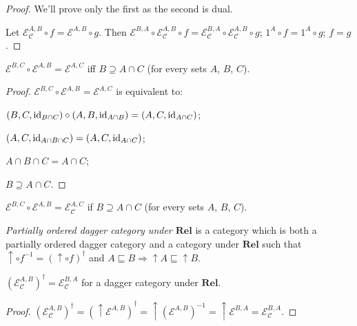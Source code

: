 \begin{proof}
  We'll prove only the first as the second is dual.
  
  Let $\mathcal{E}_{\mathcal{C}}^{A,B} \circ f = \mathcal{E}^{A,B} \circ g$. Then
  $\mathcal{E}^{B,A} \circ \mathcal{E}_{\mathcal{C}}^{A,B}
  \circ f = \mathcal{E}_{\mathcal{C}}^{B,A} \circ \mathcal{E}_{\mathcal{C}}^{A,B} \circ g$;
  $1^A \circ f = 1^A \circ g$; $f = g$.
\end{proof}

\begin{prop}
  $\mathcal{E}^{B,C} \circ \mathcal{E}^{A,B} = \mathcal{E}^{A,C}$
  iff $B \supseteq A \cap C$ (for every sets $A$, $B$, $C$).
\end{prop}

\begin{proof}
  $\mathcal{E}^{B,C} \circ \mathcal{E}^{A,B} = \mathcal{E}^{A,C}$
  is equivalent to:
  
  $(B , C , \operatorname{id}_{B \cap C}) \circ (A , B , \operatorname{id}_{A \cap B}) = (A ,
  C , \operatorname{id}_{A \cap C})$;
  
  $(A , C , \operatorname{id}_{A \cap B \cap C}) = (A , C , \operatorname{id}_{A \cap C})$;
  
  $A \cap B \cap C = A \cap C$;
  
  $B \supseteq A \cap C$.
\end{proof}

\begin{cor}
  $\mathcal{E}^{B,C} \circ \mathcal{E}^{A,B} = \mathcal{E}_{\mathcal{C}}^{A,C}$ if
  $B \supseteq A \cap C$ (for every sets $A$, $B$, $C$).
\end{cor}

\begin{defn}
  \emph{Partially ordered dagger category under $\mathbf{Rel}$} is
  a category which is both a partially ordered dagger category and a category
  under $\mathbf{Rel}$ such that $\uparrow \circ f^{- 1} = (\uparrow
  \circ f)^{\dagger}$ and $A \sqsubseteq B \Rightarrow \uparrow A \sqsubseteq
  \uparrow B$.
\end{defn}

\begin{prop}
  $(\mathcal{E}_{\mathcal{C}}^{A,B})^{\dagger} = \mathcal{E}_{\mathcal{C}}^{B,A}$ for a dagger category under
  $\mathbf{Rel}$.
\end{prop}

\begin{proof}
  $(\mathcal{E}_{\mathcal{C}}^{A,B})^{\dagger} = (\uparrow \mathcal{E}^{A,B})^{\dagger} = \uparrow (\mathcal{E}^{A,B})^{- 1} =
  \uparrow \mathcal{E}^{B,A} = \mathcal{E}_{\mathcal{C}}^{B,A}$.
\end{proof}

